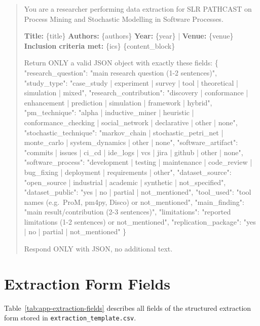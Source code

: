 \begin{quote}
\small\ttfamily
You are a researcher performing data extraction for SLR PATHCAST on
Process Mining and Stochastic Modelling in Software Processes.

\textbf{Title:} \{title\}
\textbf{Authors:} \{authors\}
\textbf{Year:} \{year\} | \textbf{Venue:} \{venue\}
\textbf{Inclusion criteria met:} \{ics\}
\{content\_block\}

Return ONLY a valid JSON object with exactly these fields:
\{
  "research\_question": "main research question (1-2 sentences)",
  "study\_type": "case\_study | experiment | survey | tool |
                 theoretical | simulation | mixed",
  "research\_contribution": "discovery | conformance | enhancement |
       prediction | simulation | framework | hybrid",
  "pm\_technique": "alpha | inductive\_miner | heuristic |
       conformance\_checking | social\_network | declarative | other | none",
  "stochastic\_technique": "markov\_chain | stochastic\_petri\_net |
       monte\_carlo | system\_dynamics | other | none",
  "software\_artifact": "commits | issues | ci\_cd | ide\_logs |
       vcs | jira | github | other | none",
  "software\_process": "development | testing | maintenance |
       code\_review | bug\_fixing | deployment | requirements | other",
  "dataset\_source": "open\_source | industrial | academic |
                     synthetic | not\_specified",
  "dataset\_public": "yes | no | partial | not\_mentioned",
  "tool\_used": "tool names (e.g.\ ProM, pm4py, Disco) or not\_mentioned",
  "main\_finding": "main result/contribution (2-3 sentences)",
  "limitations": "reported limitations (1-2 sentences) or not\_mentioned",
  "replication\_package": "yes | no | partial | not\_mentioned"
\}

Respond ONLY with JSON, no additional text.
\end{quote}

\section{Extraction Form Fields}
\label{app:slr-extraction-fields}

Table~\ref{tab:app-extraction-fields} describes all fields of the structured
extraction form stored in \texttt{extraction\_template.csv}.

